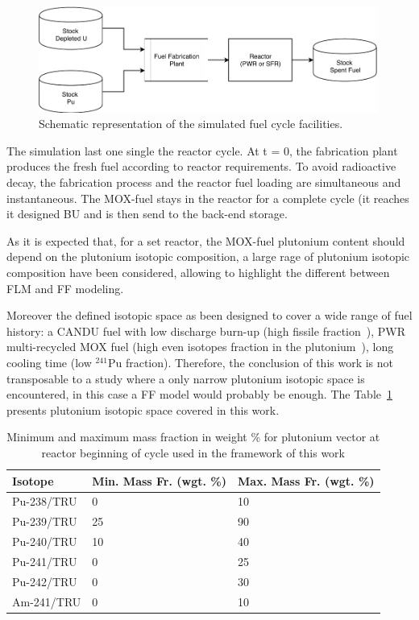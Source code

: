 \begin{figure}[h]
    \begin{center}
        \includegraphics[width = 0.99\textwidth]{FIG/FuelCycleDiagram.pdf}
        \caption{Schematic representation of the simulated fuel cycle facilities.}
        \label{fig:FuelCycle}
    \end{center}
\end{figure}

The simulation last one single the reactor cycle.  At t = 0, the fabrication
plant produces the fresh fuel according to reactor requirements. To avoid
radioactive decay, the fabrication process and the reactor fuel loading are
simultaneous and instantaneous. The MOX-fuel stays in the reactor for a complete
cycle (it reaches it designed \gls{BU} and is then send to the back-end storage.


As it is expected that, for a set reactor, the MOX-fuel plutonium content should depend on the
plutonium isotopic composition, a large rage of plutonium isotopic composition
have been considered, allowing to highlight the different between \gls{FLM} and
\gls{FF} modeling.

Moreover the defined isotopic space as been designed to cover a wide range of
fuel history: a CANDU fuel with low discharge burn-up (high fissile
fraction~\cite{Guillemin_2010}), \gls{PWR} multi-recycled MOX fuel (high even
isotopes fraction in the plutonium~\cite{Courtin_2016}), long cooling time (low
$^{241}$Pu fraction). Therefore, the conclusion of this work is not transposable
to a study where a only narrow plutonium isotopic space is encountered, in this
case a \gls{FF} model would probably be enough. The Table~\ref{tab:PuVector}
presents plutonium isotopic space covered in this work.

\begin{table}[h]
\centering
\begin{tabular}{ |l|l|l| }
  \hline
  Isotope & Min. Mass Fr. (wgt. \%) & Max. Mass Fr. (wgt. \%) \\
  \hline
  Pu-238/TRU & 0  & 10 \\
  \hline
  Pu-239/TRU & 25 & 90 \\
  \hline
  Pu-240/TRU & 10 & 40 \\
  \hline
  Pu-241/TRU & 0  & 25 \\
  \hline
  Pu-242/TRU & 0  & 30 \\
  \hline
  Am-241/TRU & 0  & 10 \\
  \hline
\end{tabular}
\label{tab:PuVector}
\caption{Minimum and maximum mass fraction in weight \% for plutonium vector at
        reactor beginning of cycle used in the framework of this work}
\end{table}

